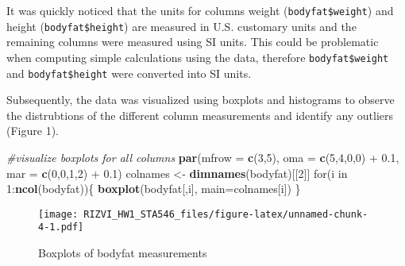 \documentclass[]{article}
\newenvironment{Shaded}{\begin{snugshade}}{\end{snugshade}}
\newcommand{\KeywordTok}[1]{\textcolor[rgb]{0.13,0.29,0.53}{\textbf{{#1}}}}
\newcommand{\DataTypeTok}[1]{\textcolor[rgb]{0.13,0.29,0.53}{{#1}}}
\newcommand{\DecValTok}[1]{\textcolor[rgb]{0.00,0.00,0.81}{{#1}}}
\newcommand{\FloatTok}[1]{\textcolor[rgb]{0.00,0.00,0.81}{{#1}}}
\newcommand{\StringTok}[1]{\textcolor[rgb]{0.31,0.60,0.02}{{#1}}}
\newcommand{\CommentTok}[1]{\textcolor[rgb]{0.56,0.35,0.01}{\textit{{#1}}}}
\newcommand{\NormalTok}[1]{{#1}}
\begin{document}
It was quickly noticed that the units for columns weight
(\texttt{bodyfat\$weight}) and height (\texttt{bodyfat\$height}) are
measured in U.S. customary units and the remaining columns were measured
using SI units. This could be problematic when computing simple
calculations using the data, therefore \texttt{bodyfat\$weight} and
\texttt{bodyfat\$height} were converted into SI units.

\begin{Shaded}
\end{Shaded}

Subsequently, the data was visualized using boxplots and histograms to
observe the distrubtions of the different column measurements and
identify any outliers (Figure 1).

\begin{Shaded}
\begin{Highlighting}[]
\CommentTok{#visualize boxplots for all columns}
\KeywordTok{par}\NormalTok{(}\DataTypeTok{mfrow =} \KeywordTok{c}\NormalTok{(}\DecValTok{3}\NormalTok{,}\DecValTok{5}\NormalTok{),}
          \DataTypeTok{oma =} \KeywordTok{c}\NormalTok{(}\DecValTok{5}\NormalTok{,}\DecValTok{4}\NormalTok{,}\DecValTok{0}\NormalTok{,}\DecValTok{0}\NormalTok{) +}\StringTok{ }\FloatTok{0.1}\NormalTok{,}
          \DataTypeTok{mar =} \KeywordTok{c}\NormalTok{(}\DecValTok{0}\NormalTok{,}\DecValTok{0}\NormalTok{,}\DecValTok{1}\NormalTok{,}\DecValTok{2}\NormalTok{) +}\StringTok{ }\FloatTok{0.1}\NormalTok{)}
\NormalTok{colnames <-}\StringTok{ }\KeywordTok{dimnames}\NormalTok{(bodyfat)[[}\DecValTok{2}\NormalTok{]]}
\NormalTok{for(i in }\DecValTok{1}\NormalTok{:}\KeywordTok{ncol}\NormalTok{(bodyfat))\{}
        \KeywordTok{boxplot}\NormalTok{(bodyfat[,i], }\DataTypeTok{main=}\NormalTok{colnames[i])}
\NormalTok{\}}
\end{Highlighting}
\end{Shaded}

\begin{figure}[htbp]
\centering
\texttt{[image: RIZVI\_HW1\_STA546\_files/figure-latex/unnamed-chunk-4-1.pdf]}
\caption{Boxplots of bodyfat measurements}
\end{figure}
\end{document}
